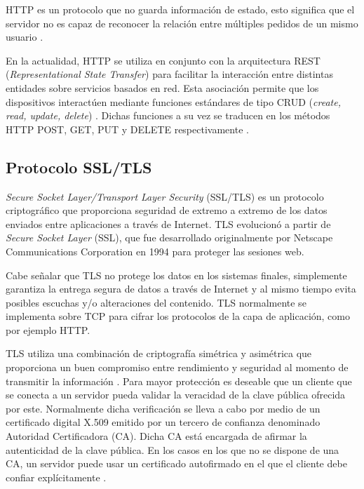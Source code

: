 HTTP es un protocolo que no guarda información de estado, esto significa que el servidor no es capaz de reconocer la relación entre múltiples pedidos de un mismo usuario  \citep{oreilly:1}.

En la actualidad, HTTP se utiliza en conjunto con la arquitectura REST (\textit{Representational State Transfer}) \citep{rest} para facilitar la interacción entre distintas entidades sobre servicios basados en red. Esta asociación permite que los dispositivos interactúen mediante funciones estándares de tipo CRUD (\textit{create, read, update, delete})  \citep{10.1145/3292674}. Dichas funciones a su vez se traducen en los métodos HTTP POST, GET, PUT y DELETE respectivamente \citep{GLAROUDIS2020107037}. 


\subsection{Protocolo SSL/TLS}
\label{sec:Protocolo SSL/TLS}
\textit{Secure Socket Layer/Transport Layer Security} (SSL/TLS) es un protocolo criptográfico que proporciona seguridad de extremo a extremo de los datos enviados entre aplicaciones a través de Internet.
TLS evolucionó a partir de \textit{Secure Socket Layer} (SSL), que fue desarrollado originalmente por Netscape Communications Corporation en 1994 para proteger las sesiones web. 


Cabe señalar que TLS no protege los datos en los sistemas finales, simplemente garantiza la entrega segura de datos a través de Internet y al mismo tiempo evita posibles escuchas y/o alteraciones del contenido.
TLS normalmente se implementa sobre TCP \citep{rfc793} para cifrar los protocolos de la capa de aplicación, como por ejemplo HTTP.

TLS utiliza una combinación de criptografía simétrica y asimétrica que proporciona un buen compromiso entre rendimiento y seguridad al momento de transmitir la información \citep{tls:2}. Para mayor protección es deseable que un cliente que se conecta a un servidor pueda validar la veracidad de la clave pública ofrecida por este. Normalmente dicha verificación se lleva a cabo por medio de un certificado digital X.509 \citep{x509:1} emitido por un tercero de confianza denominado Autoridad Certificadora (CA). Dicha CA está encargada de  afirmar la autenticidad de la clave pública. En los casos en los que no se dispone de una CA, un servidor puede usar un certificado autofirmado en el que el cliente debe confiar explícitamente \citep{tls:2}.



